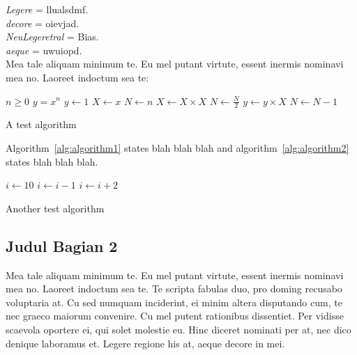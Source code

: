 \indent \textit{Legere} = llualsdmf. \\
\indent \textit{decore} = oievjad. \\
\indent \textit{NeuLegeretral} = Bias. \\
\indent \textit{aeque} = uwuiopd.\\

Mea tale aliquam minimum te. Eu mel putant virtute, essent inermis nominavi mea no. Laoreet indoctum sea te:

\begin{algorithm} 
  \begin{algorithmic}[1]
    \REQUIRE $n \geq 0$
    \ENSURE $y = x^n$
    \STATE $y \gets 1$
    \STATE $X \gets x$
    \STATE $N \gets n$
        \STATE $X \gets X \times X$
        \STATE $N \gets \frac{N}{2}$  
        \STATE $y \gets y \times X$
        \STATE $N \gets N - 1$
    \ENDIF
    \ENDWHILE
  \end{algorithmic} 
  \caption{A test algorithm}
  \label{alg:algorithm1}
\end{algorithm}

Algorithm~\ref{alg:algorithm1} states blah blah blah and algorithm~\ref{alg:algorithm2} states blah blah blah. \\

\begin{algorithm} 
  \begin{algorithmic}[1]
    \STATE $i \gets 10$
        \STATE $i \gets i-1$
    \ELSE
            \STATE $i \gets i+2$
        \ENDIF
    \ENDIF 
    \RETURN{}
  \end{algorithmic} 
  \caption{Another test algorithm}
  \label{alg:algorithm2}
\end{algorithm}

\subsection{Judul Bagian 2}
Mea tale aliquam minimum te. Eu mel putant virtute, essent inermis nominavi mea no. Laoreet indoctum sea te. Te scripta fabulas duo, pro doming recusabo voluptaria at. Cu sed numquam inciderint, ei minim altera disputando cum, te nec graeco maiorum convenire. Cu mel putent rationibus dissentiet. Per vidisse scaevola oportere ei, qui solet molestie eu. Hinc diceret nominati per at, nec dico denique laboramus et. Legere regione his at, aeque decore in mei.\\

